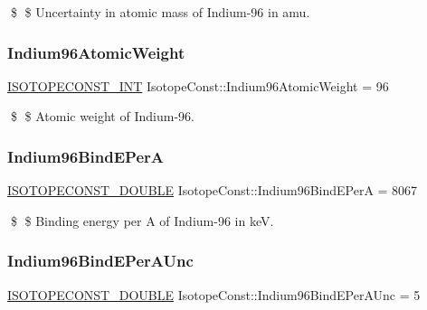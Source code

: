 \$ \$ Uncertainty in atomic mass of Indium-\/96 in amu. \mbox{\label{group___isotope_const-_indium-_in96_gabdb3ff4d94724013c26aba3220b99a2e}} 
\subsubsection{\texorpdfstring{Indium96\+Atomic\+Weight}{Indium96AtomicWeight}}
{\footnotesize\ttfamily \mbox{\hyperlink{group___isotope_const-_macros_ga5f18360b3e99483a35c32d789e62621c}{I\+S\+O\+T\+O\+P\+E\+C\+O\+N\+S\+T\+\_\+\+I\+NT}} Isotope\+Const\+::\+Indium96\+Atomic\+Weight = 96}

\$ \$ Atomic weight of Indium-\/96. \mbox{\label{group___isotope_const-_indium-_in96_ga411cc2f74df59d2e1fd00db51c544d88}} 
\subsubsection{\texorpdfstring{Indium96\+Bind\+E\+PerA}{Indium96BindEPerA}}
{\footnotesize\ttfamily \mbox{\hyperlink{group___isotope_const-_macros_ga8f45a7272ce02c0b4c65c44636ed719a}{I\+S\+O\+T\+O\+P\+E\+C\+O\+N\+S\+T\+\_\+\+D\+O\+U\+B\+LE}} Isotope\+Const\+::\+Indium96\+Bind\+E\+PerA = 8067}

\$ \$ Binding energy per A of Indium-\/96 in keV. \mbox{\label{group___isotope_const-_indium-_in96_ga4d9bc0af50c518756f084e7e59e0f91b}} 
\subsubsection{\texorpdfstring{Indium96\+Bind\+E\+Per\+A\+Unc}{Indium96BindEPerAUnc}}
{\footnotesize\ttfamily \mbox{\hyperlink{group___isotope_const-_macros_ga8f45a7272ce02c0b4c65c44636ed719a}{I\+S\+O\+T\+O\+P\+E\+C\+O\+N\+S\+T\+\_\+\+D\+O\+U\+B\+LE}} Isotope\+Const\+::\+Indium96\+Bind\+E\+Per\+A\+Unc = 5}

